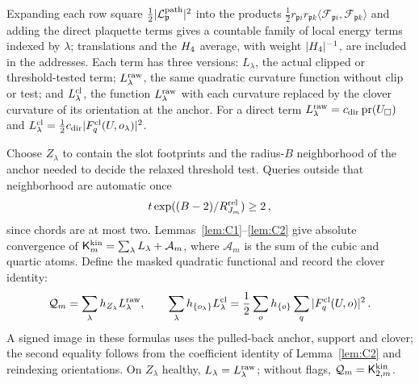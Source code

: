 Expanding each row square $\frac12|\mathcal L^{\rm path}_{\mathfrak p}|^2$ into the products $\frac12r_{\mathfrak pi}r_{\mathfrak pk}\langle\mathcal F_{\mathfrak pi},\mathcal F_{\mathfrak pk}\rangle$ and adding the direct plaquette terms gives a countable family of local energy terms indexed by $\lambda$; translations and the $H_4$ average, with weight $|H_4|^{-1}$, are included in the addresses. Each term has three versions: $L_\lambda$, the actual clipped or threshold-tested term; $L^{\rm raw}_\lambda$, the same quadratic curvature function without clip or test; and $L^{\rm cl}_\lambda$, the function $L^{\rm raw}_\lambda$ with each curvature replaced by the clover curvature of its orientation at the anchor. For a direct term $L^{\rm raw}_\lambda=c_{\rm dir}\operatorname{pr}(U_\square)$ and $L^{\rm cl}_\lambda=\frac12c_{\rm dir}|F^{\rm cl}_q(U,o_\lambda)|^2$.

Choose $Z_\lambda$ to contain the slot footprints and the radius-$B$ neighborhood of the anchor needed to decide the relaxed threshold test. Queries outside that neighborhood are automatic once
\begin{equation*}
t\exp((B-2)/R_{J_m}^{\rm rel})\ge2\,,
\end{equation*}
since chords are at most two. Lemmas~\ref{lem:C1}--\ref{lem:C2} give absolute convergence of $\mathsf K^{\rm kin}_m=\sum_\lambda L_\lambda+\mathcal A_m$, where $\mathcal A_m$ is the sum of the cubic and quartic atoms. Define the masked quadratic functional and record the clover identity:
\begin{equation}\label{eq:D-low-sums}
\mathcal Q_m=\sum_\lambda h_{Z_\lambda}L^{\rm raw}_\lambda,\qquad
\sum_\lambda h_{\{o_\lambda\}}L^{\rm cl}_\lambda=\frac12\sum_oh_{\{o\}}\sum_q|F^{\rm cl}_q(U,o)|^2\,.
\end{equation}
A signed image in these formulas uses the pulled-back anchor, support and clover; the second equality follows from the coefficient identity of Lemma~\ref{lem:C2} and reindexing orientations. On $Z_\lambda$ healthy, $L_\lambda=L^{\rm raw}_\lambda$; without flags, $\mathcal Q_m=\mathsf K_{2,m}^{\rm kin}$.

